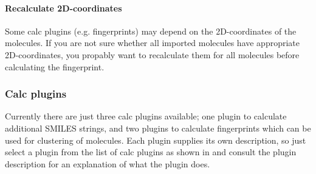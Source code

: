 \paragraph{Recalculate 2D-coordinates}
  Some calc plugins (e.g. fingerprints) may depend on the 2D-coordinates of the molecules.
  If you are not sure whether all imported molecules have appropriate 2D-coordinates,
  you propably want to recalculate them for all molecules before calculating the fingerprint.


\subsubsection{Calc plugins}
Currently there are just three calc plugins available;
one plugin to calculate additional SMILES strings, and two plugins to calculate fingerprints which can be used for clustering of molecules.
Each plugin supplies its own description, so just select a plugin from the list of calc plugins as shown in  and consult the plugin description for an explanation of what the plugin does.
